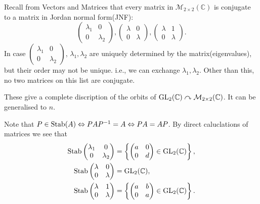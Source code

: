 \documentclass[a4paper]{article}
\begin{document}
    \begin{example}
        Recall from Vectors and Matrices that every matrix in $ \mathcal{M}_{2\times 2}(\mathbb{C}) $ is conjugate to a matrix in Jordan normal form(JNF):
        \[
            \begin{pmatrix}
                \lambda_1&0\\
                0&\lambda_2
            \end{pmatrix},
            \begin{pmatrix}
                \lambda&0\\
                0&\lambda
            \end{pmatrix},
            \begin{pmatrix}
                \lambda&1\\
                0&\lambda
            \end{pmatrix}.
        \]
        In case $\begin{pmatrix}
            \lambda_1&0\\
            0&\lambda_2
        \end{pmatrix}$, $ \lambda_1,\lambda_2 $ are uniquely determined by the matrix(eigenvalues), but their order may not be unique. i.e., we can exchange $ \lambda_1,\lambda_2 $. Other than this, no two matrices on this list are conjugate.

        These give a complete discription of the orbits of $ \mathrm{GL}_2(\mathbb{C})\curvearrowright \mathcal{M}_{2\times 2}(\mathbb{C}) $. It can be generalised to $n$.

        Note that $ P\in \operatorname{Stab}(A)\Leftrightarrow PAP^{-1}=A \Leftrightarrow PA=AP $. By direct caluclations of matrices we see that 
        \begin{align*}
            \operatorname{Stab}\begin{pmatrix}
                \lambda_1&0\\
                0&\lambda_2
            \end{pmatrix} &= \left\{ \begin{pmatrix}
                a&0\\
                0&d
            \end{pmatrix}\in \mathrm{GL}_2(\mathbb{C}) \right\},\\
            \operatorname{Stab} \begin{pmatrix}
                \lambda&0\\
                0&\lambda
            \end{pmatrix}&= \mathrm{GL}_2(\mathbb{C}),\\
            \operatorname{Stab}\begin{pmatrix}
                \lambda&1\\
                0&\lambda
            \end{pmatrix}&=\left\{ \begin{pmatrix}
                a&b\\
                0&a
            \end{pmatrix}\in \mathrm{GL}_2(\mathbb{C}) \right\}.
        \end{align*}
    \end{example}
\end{document}
